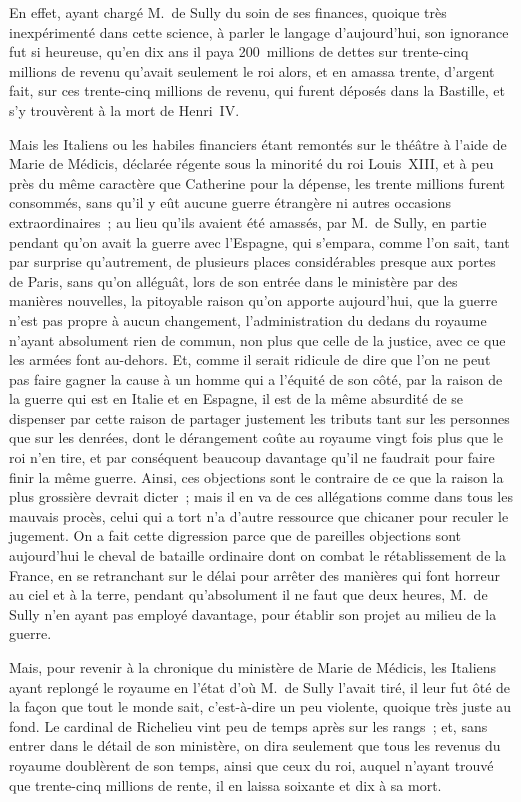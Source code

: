 \documentclass[french,twoside]{book} %
\begin{document}
En effet, ayant chargé M. de Sully du soin de ses finances, quoique très inexpérimenté dans cette science, à parler le langage d’aujourd’hui, son ignorance fut si heureuse, qu’en dix ans il paya 200 millions de dettes sur trente-cinq millions de revenu qu’avait seulement le roi alors, et en amassa trente, d’argent fait, sur ces trente-cinq millions de revenu, qui furent déposés dans la Bastille, et s’y trouvèrent à la mort de Henri IV.\par
Mais les Italiens ou les habiles financiers étant remontés sur le théâtre à l’aide de Marie de Médicis, déclarée régente sous la minorité du roi Louis XIII, et à peu près du même caractère que Catherine pour la dépense, les trente millions furent consommés, sans qu’il y eût aucune guerre étrangère ni autres occasions extraordinaires ; au lieu qu’ils avaient été amassés, par M. de Sully, en partie pendant qu’on avait la guerre avec l’Espagne, qui s’empara, comme l’on sait, tant par surprise qu’autrement, de plusieurs places considérables presque aux portes de Paris, sans qu’on alléguât, lors de son entrée dans le ministère par des manières nouvelles, la pitoyable raison qu’on apporte aujourd’hui, que la guerre n’est pas propre à aucun changement, l’administration du dedans du royaume n’ayant absolument rien de commun, non plus que celle de la justice, avec ce que les armées font au-dehors. Et, comme il serait ridicule de dire que l’on ne peut pas faire gagner la cause à un homme qui a l’équité de son côté, par la raison de la guerre qui est en Italie et en Espagne, il est de la même absurdité de se dispenser par cette raison de partager justement les tributs tant sur les personnes que sur les denrées, dont le dérangement coûte au royaume vingt fois plus que le roi n’en tire, et par conséquent beaucoup davantage qu’il ne faudrait pour faire finir la même guerre. Ainsi, ces objections sont le contraire de ce que la raison la plus grossière devrait dicter ; mais il en va de ces allégations comme dans tous les mauvais procès, celui qui a tort n’a d’autre ressource que chicaner pour reculer le jugement. On a fait cette digression parce que de pareilles objections sont aujourd’hui le cheval de bataille ordinaire dont on combat le rétablissement de la France, en se retranchant sur le délai pour arrêter des manières qui font horreur au ciel et à la terre, pendant qu’absolument il ne faut que deux heures, M. de Sully n’en ayant pas employé davantage, pour établir son projet au milieu de la guerre.\par
Mais, pour revenir à la chronique du ministère de Marie de Médicis, les Italiens ayant replongé le royaume en l’état d’où M. de Sully l’avait tiré, il leur fut ôté de la façon que tout le monde sait, c’est-à-dire un peu violente, quoique très juste au fond. Le cardinal de Richelieu vint peu de temps après sur les rangs ; et, sans entrer dans le détail de son ministère, on dira seulement que tous les revenus du royaume doublèrent de son temps, ainsi que ceux du roi, auquel n’ayant trouvé que trente-cinq millions de rente, il en laissa soixante et dix à sa mort.\par
\end{document}
